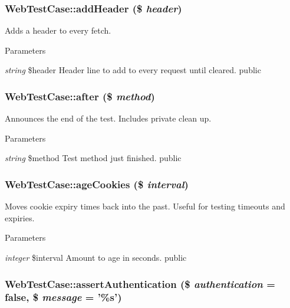 \hypertarget{class_web_test_case_a8580ffac71f2d312784b87faa9452bdc}{
\subsubsection[{addHeader}]{\setlength{\rightskip}{0pt plus 5cm}WebTestCase::addHeader (\$ {\em header})}}
\label{class_web_test_case_a8580ffac71f2d312784b87faa9452bdc}
Adds a header to every fetch. 
\begin{DoxyParams}{Parameters}
\item[{\em string}]\$header Header line to add to every request until cleared.  public \end{DoxyParams}
\hypertarget{class_web_test_case_ab29c41a37c83f0a4a230f81dcee4dcbf}{
\subsubsection[{after}]{\setlength{\rightskip}{0pt plus 5cm}WebTestCase::after (\$ {\em method})}}
\label{class_web_test_case_ab29c41a37c83f0a4a230f81dcee4dcbf}
Announces the end of the test. Includes private clean up. 
\begin{DoxyParams}{Parameters}
\item[{\em string}]\$method Test method just finished.  public \end{DoxyParams}
\hypertarget{class_web_test_case_a1f28c1af59fd3c2c4c9a2d837c089f7a}{
\subsubsection[{ageCookies}]{\setlength{\rightskip}{0pt plus 5cm}WebTestCase::ageCookies (\$ {\em interval})}}
\label{class_web_test_case_a1f28c1af59fd3c2c4c9a2d837c089f7a}
Moves cookie expiry times back into the past. Useful for testing timeouts and expiries. 
\begin{DoxyParams}{Parameters}
\item[{\em integer}]\$interval Amount to age in seconds.  public \end{DoxyParams}
\hypertarget{class_web_test_case_a1cf868c95aec441290995d71aba42f0a}{
\subsubsection[{assertAuthentication}]{\setlength{\rightskip}{0pt plus 5cm}WebTestCase::assertAuthentication (\$ {\em authentication} = {\ttfamily false}, \/  \$ {\em message} = {\ttfamily '\%s'})}}
